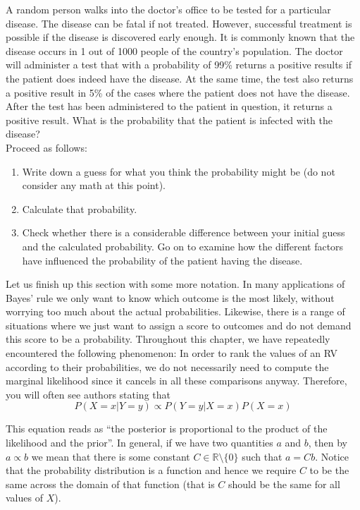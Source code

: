 \begin{Exercise}
A random person walks into the doctor's office to be tested for a particular disease. The disease can be fatal if not treated. However,
successful treatment is possible if the disease is discovered early enough. It is commonly known that the disease occurs in 1 out
of 1000 people of the country's population. The doctor will administer a test that with a probability of 99\% returns a positive results
if the patient does indeed have the disease. At the same time, the test also returns a positive result in 5\% of the cases where the
patient does not have the disease. After the test has been administered to the patient in question, it returns a positive result.
What is the probability that the patient is infected with the disease? 
\\
Proceed as follows:
\begin{enumerate}
\item Write down a guess for what you think the probability might be (do not consider any math at this point).
\item Calculate that probability.
\item Check whether there is a considerable difference between your initial guess and the calculated probability. Go on to examine
how the different factors have influenced the probability of the patient having the disease.
\end{enumerate}
\end{Exercise}

Let us finish up this section with some more notation. In many applications of Bayes' rule we only want to know which outcome is
the most likely, without worrying too much about the actual probabilities. Likewise, there is a range of situations where we
just want to assign a score to outcomes and do not demand this score to be a probability. Throughout this chapter,
we have repeatedly encountered the following phenomenon: In order to rank the values of an RV according to their probabilities, we do not necessarily need to compute the marginal likelihood since it cancels in all these comparisons anyway. Therefore, you will often see authors stating that
\begin{equation} \label{proportionality}
P(X=x|Y=y) \propto P(Y=y|X=x)P(X=x)
\end{equation}

This equation reads as ``the posterior is proportional to the product of the likelihood and the prior''. In general, if we have two quantities
$ a $ and $ b $, then by $ a \propto b $ we mean that there is some constant 
$ C \in \mathbb{R} \setminus \{0\} $ such that $ a = Cb $. Notice
that the probability distribution is a function and hence we require $ C $ to be the same across the domain of that function (that
is $ C $ should be the same for all values of $ X $).

